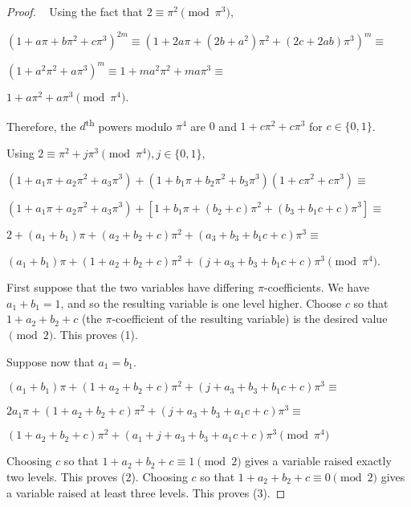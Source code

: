 \documentclass[12pt]{amsart}
\begin{document}
\begin{proof}~
Using the fact that $2 \equiv \pi^2 \pmod{\pi^3}$,

\smallskip

$(1 + a\pi + b\pi^2 + c\pi^3)^{2m} \equiv (1 + 2a\pi + (2b+a^2)\pi^2 + (2c + 2ab)\pi^3)^m \equiv$

$(1 + a^2\pi^2 + a\pi^3)^m \equiv 1 + ma^2\pi^2 + ma\pi^3 \equiv$

$1 + a\pi^2 + a\pi^3 \pmod{\pi^4}.$

Therefore, the $d$\textsuperscript{th} powers modulo $\pi^4$ are $0$ and $1 + c\pi^2 + c\pi^3$ for $c \in \{0,1\}$.

\bigskip

Using $2 \equiv \pi^2 + j\pi^3 \pmod{\pi^4}, j \in \{0, 1\}$,

\smallskip

$(1 + a_1\pi + a_2\pi^2 + a_3\pi^3) + (1 + b_1\pi + b_2\pi^2 + b_3\pi^3)(1 + c\pi^2 + c\pi^3) \equiv $

$(1 + a_1\pi + a_2\pi^2 + a_3\pi^3) + [1 + b_1\pi + (b_2 + c)\pi^2 + (b_3 + b_1c + c)\pi^3] \equiv$

$2 + (a_1 + b_1)\pi + (a_2 + b_2 + c)\pi^2 + (a_3 + b_3 + b_1c + c)\pi^3 \equiv$

$(a_1 + b_1)\pi + (1 + a_2 + b_2 + c)\pi^2 + (j + a_3 + b_3 + b_1c + c)\pi^3 \pmod{\pi^4}$.

\bigskip

First suppose that the two variables have differing $\pi$-coefficients.  We have $a_1 + b_1 = 1$, and so the resulting variable is one level higher.  Choose $c$ so that $1 + a_2 + b_2 + c$ (the $\pi$-coefficient of the resulting variable) is the desired value $\pmod{2}$.  This proves (1).

\bigskip

Suppose now that $a_1 = b_1$.

\smallskip

$(a_1 + b_1)\pi + (1 + a_2 + b_2 + c)\pi^2 + (j + a_3 + b_3 + b_1c + c)\pi^3 \equiv$

$2a_1\pi + (1 + a_2 + b_2 + c)\pi^2 + (j + a_3 + b_3 + a_1c + c)\pi^3 \equiv$

$(1 + a_2 + b_2 + c)\pi^2 + (a_1 + j + a_3 + b_3 + a_1c + c)\pi^3 \pmod{\pi^4}$

\smallskip

Choosing $c$ so that $1 + a_2 + b_2 + c \equiv 1 \pmod{2}$ gives a variable raised exactly two levels.  This proves (2).  Choosing $c$ so that $1 + a_2 + b_2 + c \equiv 0 \pmod{2}$ gives a variable raised at least three levels.  This proves (3).


\end{proof}
\end{document}
